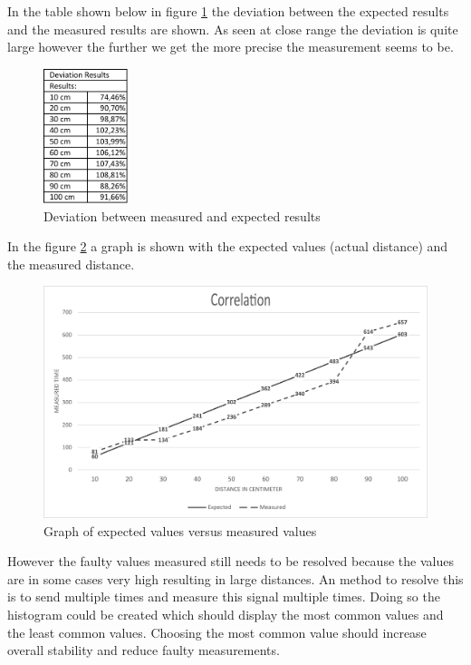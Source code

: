 \documentclass[10pt,a4paper]{article}
\begin{document}
In the table shown below in figure \ref{fig:deviationresults} the deviation between the expected results and the measured results are shown. As seen at close range the deviation is quite large however the further we get the more precise the measurement seems to be.   

\begin{figure}[H]
   \centering
   \includegraphics[width=0.22\textwidth]{deviationcorrelation.pdf}
   \caption{Deviation between measured and expected results}
   \label{fig:deviationresults}
\end{figure}

In the figure \ref{fig:grafiekcorrelation} a graph is shown with the expected values (actual distance) and the measured distance. 

\begin{figure}[H]
   \centering
   \includegraphics[width=\textwidth]{grafiekcorrelation.pdf}
   \caption{Graph of expected values versus measured values}
   \label{fig:grafiekcorrelation}
\end{figure}

However the faulty values measured still needs to be resolved because the values are in some cases very high resulting in large distances. An method to resolve this is to send multiple times and measure this signal multiple times. Doing so the histogram could be created which should display the most common values and the least common values. Choosing the most common value should increase overall stability and reduce faulty measurements.
\end{document}
